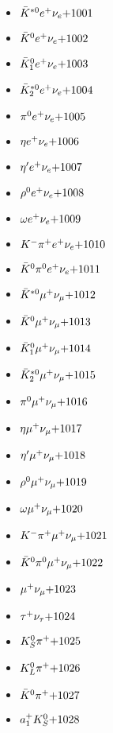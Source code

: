 
 \begin{multicols}{3} 
 \begin{itemize}
 \item $ \bar{K}^{*0} e^{+} \nu_{e} \hfill{+1001}$
 \item $ \bar{K}^{0} e^{+} \nu_{e} \hfill{+1002}$
 \item $ \bar{K}_{1}^{0} e^{+} \nu_{e} \hfill{+1003}$
 \item $ \bar{K}_{2}^{*0} e^{+} \nu_{e} \hfill{+1004}$
 \item $ \pi^{0} e^{+} \nu_{e} \hfill{+1005}$
 \item $ \eta e^{+} \nu_{e} \hfill{+1006}$
 \item $ {\eta^{\prime}} e^{+} \nu_{e} \hfill{+1007}$
 \item $ \rho^{0} e^{+} \nu_{e} \hfill{+1008}$
 \item $ \omega e^{+} \nu_{e} \hfill{+1009}$
 \item $ K^{-} \pi^{+} e^{+} \nu_{e} \hfill{+1010}$
 \item $ \bar{K}^{0} \pi^{0} e^{+} \nu_{e} \hfill{+1011}$
 \item $ \bar{K}^{*0} \mu^{+} \nu_{\mu} \hfill{+1012}$
 \item $ \bar{K}^{0} \mu^{+} \nu_{\mu} \hfill{+1013}$
 \item $ \bar{K}_{1}^{0} \mu^{+} \nu_{\mu} \hfill{+1014}$
 \item $ \bar{K}_{2}^{*0} \mu^{+} \nu_{\mu} \hfill{+1015}$
 \item $ \pi^{0} \mu^{+} \nu_{\mu} \hfill{+1016}$
 \item $ \eta \mu^{+} \nu_{\mu} \hfill{+1017}$
 \item $ {\eta^{\prime}} \mu^{+} \nu_{\mu} \hfill{+1018}$
 \item $ \rho^{0} \mu^{+} \nu_{\mu} \hfill{+1019}$
 \item $ \omega \mu^{+} \nu_{\mu} \hfill{+1020}$
 \item $ K^{-} \pi^{+} \mu^{+} \nu_{\mu} \hfill{+1021}$
 \item $ \bar{K}^{0} \pi^{0} \mu^{+} \nu_{\mu} \hfill{+1022}$
 \item $ \mu^{+} \nu_{\mu} \hfill{+1023}$
 \item $ \tau^{+} \nu_{\tau} \hfill{+1024}$
 \item $ K_{S}^{0} \pi^{+} \hfill{+1025}$
 \item $ K_{L}^{0} \pi^{+} \hfill{+1026}$
 \item $ \bar{K}^{0} \pi^{+} \hfill{+1027}$
 \item $ a_{1}^{+} K_{S}^{0} \hfill{+1028}$

\end{itemize}
\end{multicols}
